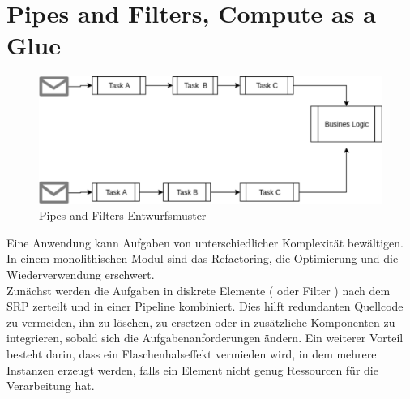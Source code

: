 \documentclass[
12pt,
english,
ngerman,
headsepline,
twoside,
openright,
numbers=noenddot,version=first
]{scrreprt}
\begin{document}
\section{Pipes and Filters, Compute as a Glue}
\label{sec:pipes-filters}
\begin{figure}[H]
	\centering
	\includegraphics[scale=0.60]{./pics/pipes-and-filters.eps}
	\caption{Pipes and Filters Entwurfsmuster}
	\label{pic:pipes-and-filters}
\end{figure}
Eine Anwendung kann Aufgaben von unterschiedlicher Komplexität bewältigen. In einem monolithischen Modul sind das Refactoring, die Optimierung und die Wiederverwendung erschwert. \\
Zunächst werden die Aufgaben in diskrete Elemente ( oder Filter ) nach dem \acrshort{SRP} zerteilt und in einer Pipeline kombiniert. Dies hilft redundanten Quellcode zu vermeiden, ihn zu löschen, zu ersetzen oder in zusätzliche Komponenten zu integrieren, sobald sich die Aufgabenanforderungen ändern\cite{patternsCloud}. Ein weiterer Vorteil besteht darin, dass ein Flaschenhalseffekt vermieden wird, in dem mehrere Instanzen erzeugt werden, falls ein Element nicht genug Ressourcen für die Verarbeitung hat. 
\end{document}
